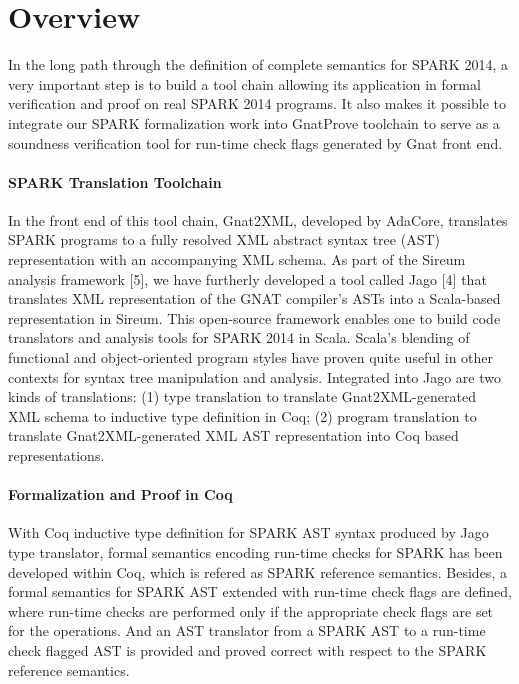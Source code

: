 \section{Overview}
In the long path through the definition of complete semantics for SPARK 2014, a
very important step is to build a tool chain allowing its application in formal
verification and proof on real SPARK 2014 programs. It also makes it possible to
integrate our SPARK formalization work into GnatProve toolchain to serve as
a soundness verification tool for run-time check flags generated by Gnat front
end.

\paragraph{SPARK Translation Toolchain}
In the front end of this tool chain, Gnat2XML, developed by AdaCore, translates
SPARK programs to a fully resolved XML abstract syntax tree (AST) representation
with an accompanying XML schema. As part of the Sireum analysis framework [5],
we have furtherly developed a tool called Jago [4] that translates XML
representation of the GNAT compiler's ASTs into a Scala-based representation in
Sireum. This open-source framework enables one to build code translators and
analysis tools for SPARK 2014 in Scala. Scala's blending of functional and
object-oriented program styles have proven quite useful in other contexts for
syntax tree manipulation and analysis. Integrated into Jago are two kinds of
translations: (1) type translation to translate Gnat2XML-generated XML schema to
inductive type definition in Coq; (2) program translation to translate
Gnat2XML-generated XML AST representation into Coq based representations.

\paragraph{Formalization and Proof in Coq}
With Coq inductive type definition for SPARK AST syntax produced by Jago type
translator, formal semantics encoding run-time checks for SPARK has
been developed within Coq, which is refered as SPARK reference semantics.
Besides, a formal semantics for SPARK AST extended with run-time check flags
are defined, where run-time checks are performed only if the appropriate check
flags are set for the operations. And an AST translator from a SPARK AST to a
run-time check flagged AST is provided and proved correct with respect to the
SPARK reference semantics.

